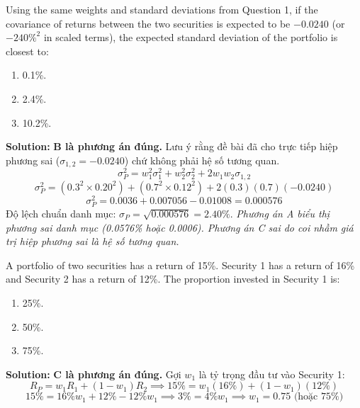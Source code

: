 \begin{tcolorbox}[
	colback=gray!5!white,
	colframe=black!15!white,
	boxrule=0.5pt,
	arc=3pt,
	title=\textbf{Question 2},
	coltitle=black,
	colbacktitle=black!5!white,
	before skip=6pt,
	after skip=6pt,
	breakable
]
Using the same weights and standard deviations from Question 1, if the covariance of returns between the two securities is expected to be $-0.0240$ (or $-240\%^2$ in scaled terms), the expected standard deviation of the portfolio is closest to:
\begin{enumerate}[label=\Alph*.]
	\item 0.1\%.
	\item 2.4\%.
	\item 10.2\%.
\end{enumerate}

\textbf{Solution:}
\textbf{B là phương án đúng.} Lưu ý rằng đề bài đã cho trực tiếp hiệp phương sai ($\sigma_{1,2} = -0.0240$) chứ không phải hệ số tương quan.
\[
\sigma_P^2 = w_1^2 \sigma_1^2 + w_2^2 \sigma_2^2 + 2 w_1 w_2 \sigma_{1,2}
\]
\[
\sigma_P^2 = (0.3^2 \times 0.20^2) + (0.7^2 \times 0.12^2) + 2(0.3)(0.7)(-0.0240)
\]
\[
\sigma_P^2 = 0.0036 + 0.007056 - 0.01008 = 0.000576
\]
Độ lệch chuẩn danh mục: $\sigma_P = \sqrt{0.000576} = 2.40\%$.
\textit{Phương án A biểu thị phương sai danh mục (0.0576\% hoặc 0.0006). Phương án C sai do coi nhầm giá trị hiệp phương sai là hệ số tương quan.}
\end{tcolorbox}

\begin{tcolorbox}[
	colback=gray!5!white,
	colframe=black!15!white,
	boxrule=0.5pt,
	arc=3pt,
	title=\textbf{Question 3},
	coltitle=black,
	colbacktitle=black!5!white,
	before skip=6pt,
	after skip=6pt,
	breakable
]
A portfolio of two securities has a return of 15\%. Security 1 has a return of 16\% and Security 2 has a return of 12\%. The proportion invested in Security 1 is:
\begin{enumerate}[label=\Alph*.]
	\item 25\%.
	\item 50\%.
	\item 75\%.
\end{enumerate}

\textbf{Solution:}
\textbf{C là phương án đúng.} Gợi $w_1$ là tỷ trọng đầu tư vào Security 1:
\[
R_P = w_1 R_1 + (1 - w_1) R_2 \implies 15\% = w_1(16\%) + (1 - w_1)(12\%)
\]
\[
15\% = 16\% w_1 + 12\% - 12\% w_1 \implies 3\% = 4\% w_1 \implies w_1 = 0.75 \text{ (hoặc 75\%)}
\]
\end{tcolorbox}

